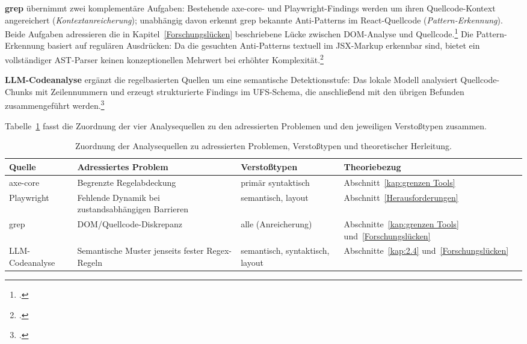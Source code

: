 \textbf{grep} übernimmt zwei komplementäre Aufgaben: Bestehende axe-core- und Playwright-Findings werden um ihren Quellcode-Kontext angereichert (\textit{Kontextanreicherung}); unabhängig davon erkennt grep bekannte Anti-Patterns im React-Quellcode (\textit{Pattern-Erkennung}). Beide Aufgaben adressieren die in Kapitel~\ref{Forschungslücken} beschriebene Lücke zwischen \ac{DOM}-Analyse und Quellcode.\footcite[Vgl.][]{fathallah_accessguru_2025} Die Pattern-Erkennung basiert auf regulären Ausdrücken: Da die gesuchten Anti-Patterns textuell im \ac{JSX}-Markup erkennbar sind, bietet ein vollständiger \ac{AST}-Parser keinen konzeptionellen Mehrwert bei erhöhter Komplexität.\footcite[Vgl.][S.~12]{bassi_assessment_2025}

\textbf{\ac{LLM}-Codeanalyse} ergänzt die regelbasierten Quellen um eine semantische Detektionsstufe: Das lokale Modell analysiert Quellcode-Chunks mit Zeilennummern und erzeugt strukturierte Findings im \ac{UFS}-Schema, die anschließend mit den übrigen Befunden zusammengeführt werden.\footcite[Vgl.][]{fathallah_accessguru_2025}

Tabelle~\ref{tab:tool-mapping} fasst die Zuordnung der vier Analysequellen zu den adressierten Problemen und den jeweiligen Verstoßtypen zusammen.

\begin{table}[H]
\centering
\small
\renewcommand{\arraystretch}{1.15}
\begin{tabular}{@{}>{\raggedright\arraybackslash}p{2.2cm}>{\raggedright\arraybackslash\footnotesize}p{5.5cm}>{\raggedright\arraybackslash}p{3.4cm}>{\raggedright\arraybackslash}p{4cm}@{}}
\toprule
\textbf{Quelle} & \textbf{Adressiertes Problem} & \textbf{Verstoßtypen} & \textbf{Theoriebezug} \\
\midrule
axe-core & Begrenzte Regelabdeckung\footnotemark{} & primär syntaktisch & Abschnitt~\ref{kap:grenzen Tools} \\
Playwright & Fehlende Dynamik bei zustandsabhängigen Barrieren & semantisch, layout & Abschnitt~\ref{Herausforderungen} \\
grep & \ac{DOM}/Quellcode-Diskrepanz\footnotemark{} & alle (Anreicherung) & Abschnitte~\ref{kap:grenzen Tools} und~\ref{Forschungslücken} \\
\ac{LLM}-Codeanalyse & Semantische Muster jenseits fester Regex-Regeln & semantisch, syntaktisch, layout & Abschnitte~\ref{kap:2.4} und~\ref{Forschungslücken} \\
\bottomrule
\end{tabular}
\caption[Zuordnung der Analysequellen]{Zuordnung der Analysequellen zu adressierten Problemen, Verstoßtypen und theoretischer Herleitung.}
\label{tab:tool-mapping}
\end{table}
\addtocounter{footnote}{-1}
\addtocounter{footnote}{1}

